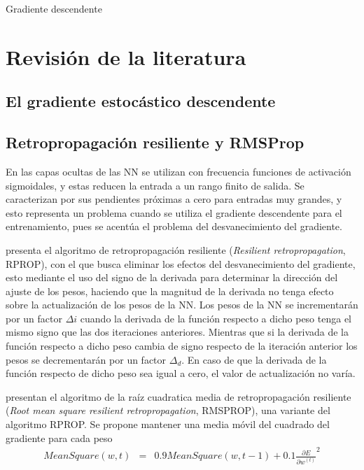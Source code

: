 \begin{imagen}
	\scalebox{1.0}{}
	\caption{Gradiente descendente}
	\label{fig:vanishing}
\end{imagen}


\section{Revisión de la literatura}
\subsection{El gradiente estocástico descendente}
\subsection{Retropropagación resiliente y RMSProp}
En las capas ocultas de las NN se utilizan con frecuencia funciones de activación sigmoidales, y estas reducen la entrada a un rango finito de salida. Se caracterizan por sus pendientes próximas a cero para entradas muy grandes, y esto representa un problema cuando se utiliza el gradiente descendente para el entrenamiento, pues se acentúa el problema del desvanecimiento del gradiente.

 presenta el algoritmo de retropropagación resiliente ({\em Resilient retropropagation}, RPROP), con el que busca eliminar los efectos del desvanecimiento del gradiente, esto mediante el uso del signo de la derivada para determinar la dirección del ajuste de los pesos, haciendo que la magnitud de la derivada no tenga efecto sobre la actualización de los pesos de la NN. Los pesos de la NN se incrementarán por un factor $\Delta{i}$ cuando la derivada de la función respecto a dicho peso tenga el mismo signo que las dos iteraciones anteriores. Mientras que si la derivada de la función respecto a dicho peso cambia de signo respecto de la iteración anterior los pesos se decrementarán por un factor $\Delta_{d}$. En caso de que la derivada de la función respecto de dicho peso sea igual a cero, el valor de actualización no varía.

 presentan el algoritmo de la raíz cuadratica media de retropropagación resiliente ({\em Root mean square resilient retropropagation}, RMSPROP), una variante  del algoritmo RPROP. Se propone mantener una media móvil del cuadrado del gradiente para cada peso
\begin{eqnarray}
	MeanSquare(w, t) &=& 0.9MeanSquare(w, t - 1) + 0.1\frac{\partial E}{\partial w^{(t)}}^{2}
\end{eqnarray}

